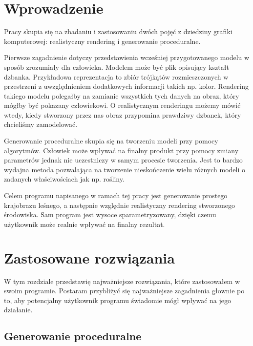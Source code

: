\documentclass[inz,longabstract]{iithesis}
\author         {Bartosz Rudzki}
\begin{document}
\chapter{Wprowadzenie}
    Pracy skupia się na zbadaniu i zastosowaniu dwóch pojęć z dziedziny grafiki komputerowej: realistyczny rendering i generowanie proceduralne. 
    
    Pierwsze zagadnienie dotyczy przedstawienia wcześniej przygotowanego modelu w sposób zrozumiały dla człowieka. Modelem może być plik opisujący kształt dzbanka. Przykładowa reprezentacja to zbiór trójkątów rozmieszczonych w przestrzeni z uwzględnieniem dodatkowych informacji takich np. kolor. Rendering takiego modelu polegałby na zamianie wszystkich tych danych na obraz, który mógłby być pokazany człowiekowi. O realistycznym renderingu możemy mówić wtedy, kiedy stworzony przez nas obraz przypomina prawdziwy dzbanek, który chcieliśmy zamodelować. 
    
    Generowanie proceduralne skupia się na tworzeniu modeli przy pomocy algorytmów. Człowiek może wpływać na finalny produkt przy pomocy zmiany parametrów jednak nie uczestniczy w samym procesie tworzenia. Jest to bardzo wydajna metoda pozwalająca na tworzenie nieskończenie wielu różnych modeli o zadanych właściwościach jak np. rośliny.
    
    Celem programu napisanego w ramach tej pracy jest generowanie prostego krajobrazu leśnego, a następnie względnie realistyczny rendering stworzonego środowiska. Sam program jest wysoce sparametryzowany, dzięki czemu użytkownik może realnie wpływać na finalny rezultat.
    
\chapter{Zastosowane rozwiązania}
    W tym rozdziale przedstawię najważniejsze rozwiązania, które zastosowałem w swoim programie. Postaram przybliżyć się najważniejsze zagadnienia głownie po to, aby potencjalny użytkownik programu świadomie mógł wpływać na jego działanie. 
    
    \section{Generowanie proceduralne}
\end{document}
